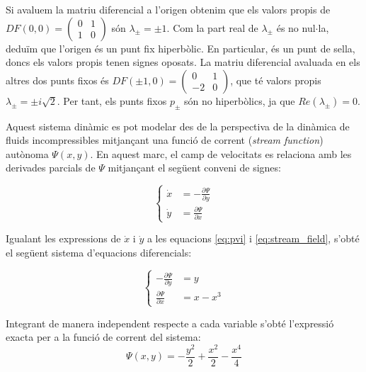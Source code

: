\documentclass[12,twoside]{TFG-GM}
\theoremstyle{definition}
\theoremstyle{remark}
\begin{document}
Si avaluem la matriu diferencial a l'origen obtenim que els valors propis de 
$DF(0,0) =\begin{pmatrix}
0 & 1 \\
1 & 0
\end{pmatrix}$
són $\lambda_{\pm} = \pm1$.
Com la part real de $\lambda_\pm$ és no nul$\cdot$la, deduïm que l'origen és un punt fix hiperbòlic.
En particular, és un punt de sella, doncs els valors propis tenen signes oposats.
La matriu diferencial avaluada en els altres dos punts fixos és $DF(\pm1,0) =\begin{pmatrix}
0 & 1 \\
-2 & 0
\end{pmatrix}$, que té valors propis $\lambda_\pm = \pm i\sqrt{2}$.
Per tant, els punts fixos $p_\pm$ són no hiperbòlics, ja que $Re(\lambda_\pm) = 0$.

Aquest sistema dinàmic es pot modelar des de la perspectiva de la dinàmica de fluids incompressibles mitjançant una funció de corrent (\textit{stream function}) autònoma $\Psi(x,y)$. En aquest marc, el camp de velocitats es relaciona amb les derivades parcials de $\Psi$ mitjançant el següent conveni de signes:

\begin{equation}
    \label{eq:stream_field}
    \left\{
    \begin{aligned}
        \dot{x} &= -\frac{\partial \Psi}{\partial y}\\
        \dot{y} &= \frac{\partial \Psi}{\partial x} 
    \end{aligned}
    \right.
\end{equation}

Igualant les expressions de $\dot{x}$ i $\dot{y}$ a les equacions \eqref{eq:pvi} i \eqref{eq:stream_field}, s'obté el següent sistema d'equacions diferencials:

\begin{equation}
    \label{eq:edo_stream}
    \left\{
    \begin{aligned}
        -\frac{\partial \Psi}{\partial y} &= y \\
        \frac{\partial \Psi}{\partial x} &= x - x^3 
    \end{aligned}
    \right.
\end{equation}

Integrant de manera independent respecte a cada variable s'obté l'expressió exacta per a la funció de corrent del sistema:
\begin{equation}
    \Psi(x,y) = -\frac{y^2}{2} + \frac{x^2}{2} - \frac{x^4}{4}
\end{equation}
\end{document}
